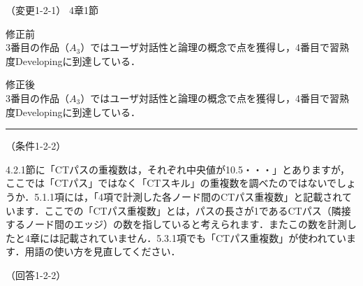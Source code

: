 \documentclass{jarticle} %
\def\subsection#1{ \vspace{1pc} {\gt #1} }
\def\nextans{ \vspace{2pc} \hrule }
\begin{document}



\subsection{（変更1-2-1） 4章1節}
\vspace{-0.3cm}
\begin{description}
\item 修正前\\
\phantom{　}
3番目の作品（$A_3$）ではユーザ対話性と論理の概念で\textcolor{red}{}点を獲得し，4番目で習熟度Developingに到達している．
\vspace{-0.3cm}
\item 修正後\\
\phantom{　}
3番目の作品（$A_3$）ではユーザ対話性と論理の概念で\textcolor{red}{}点を獲得し，4番目で習熟度Developingに到達している．
\end{description}


\newpage
\nextans
\subsection{（条件1-2-2）}

4.2.1節に「CTパスの重複数は，それぞれ中央値が10.5・・・」とありますが，ここでは「CTパス」ではなく「CTスキル」の重複数を調べたのではないでしょうか．5.1.1項には，「4項で計測した各ノード間のCTパス重複数」と記載されています．ここでの「CTパス重複数」とは，パスの長さが1であるCTパス（隣接するノード間のエッジ）の数を指していると考えられます．またこの数を計測したと4章には記載されていません．5.3.1項でも「CTパス重複数」が使われています．用語の使い方を見直してください．

\subsection{（回答1-2-2）}
\end{document}
